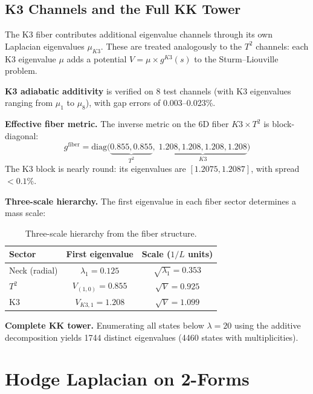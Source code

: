 \documentclass[11pt,a4paper]{article}
\theoremstyle{remark}
\begin{document}
\subsection{K3 Channels and the Full KK Tower}

The K3 fiber contributes additional eigenvalue channels through its own Laplacian
eigenvalues $\mu_{K3}$. These are treated analogously to the $T^2$ channels: each K3
eigenvalue $\mu$ adds a potential $V = \mu \times g^{K3}(s)$ to the Sturm--Liouville problem.

\textbf{K3 adiabatic additivity} is verified on 8 test channels (with K3 eigenvalues
ranging from $\mu_1$ to $\mu_8$), with gap errors of 0.003--0.023\%.

\textbf{Effective fiber metric.} The inverse metric on the 6D fiber $K3 \times T^2$ is
block-diagonal:
\begin{equation}
g^{\mathrm{fiber}} = \mathrm{diag}\big(\underbrace{0.855, 0.855}_{T^2},\; \underbrace{1.208, 1.208, 1.208, 1.208}_{K3}\big)
\end{equation}
The K3 block is nearly round: its eigenvalues are $[1.2075, 1.2087]$, with spread $< 0.1\%$.

\textbf{Three-scale hierarchy.} The first eigenvalue in each fiber sector determines a
mass scale:

\begin{table}[htbp]
\centering
\begin{tabular}{lcc}
\toprule
Sector & First eigenvalue & Scale ($1/L$ units) \\
\midrule
Neck (radial) & $\lambda_1 = 0.125$ & $\sqrt{\lambda_1} = 0.353$ \\
$T^2$ & $V_{(1,0)} = 0.855$ & $\sqrt{V} = 0.925$ \\
K3 & $V_{K3,1} = 1.208$ & $\sqrt{V} = 1.099$ \\
\bottomrule
\end{tabular}
\caption{Three-scale hierarchy from the fiber structure.}
\label{tab:hierarchy}
\end{table}

\textbf{Complete KK tower.} Enumerating all states below $\lambda = 20$ using the additive
decomposition yields 1744 distinct eigenvalues (4460 states with multiplicities).

\section{Hodge Laplacian on 2-Forms}
\end{document}
